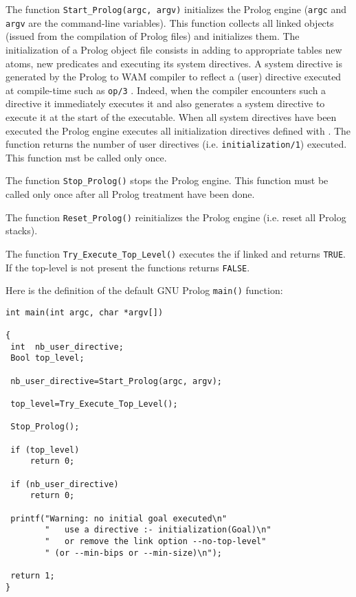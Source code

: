 The function \texttt{Start\_Prolog(argc, argv)} initializes the Prolog engine
(\texttt{argc} and \texttt{argv} are the command-line variables). This
function collects all linked objects (issued from the compilation of Prolog
files) and initializes them. The initialization of a Prolog object file
consists in adding to appropriate tables new atoms, new predicates and
executing its system directives. A system directive is generated by the
Prolog to WAM compiler to reflect a (user) directive executed at compile-time
such as \texttt{op/3} . Indeed, when the compiler encounters
such a directive it immediately executes it and also generates a system
directive to execute it at the start of the executable.  When all system
directives have been executed the Prolog engine executes all initialization
directives defined with 
. The function returns the number of user
directives (i.e. \texttt{initialization/1}) executed. This function mst be
called only once.

The function \texttt{Stop\_Prolog()} stops the Prolog engine. This function
must be called only once after all Prolog treatment have been done.

The function \texttt{Reset\_Prolog()} reinitializes the Prolog engine
(i.e. reset all Prolog stacks).

The function \texttt{Try\_Execute\_Top\_Level()} executes the
 if linked  and returns
\texttt{TRUE}. If the top-level is not present the functions returns
\texttt{FALSE}.

Here is the definition of the default GNU Prolog \texttt{main()} function:

\begin{Indentation}
\begin{verbatim}
int main(int argc, char *argv[])

{
 int  nb_user_directive;
 Bool top_level;

 nb_user_directive=Start_Prolog(argc, argv);

 top_level=Try_Execute_Top_Level();

 Stop_Prolog();

 if (top_level)
     return 0;

 if (nb_user_directive)
     return 0;

 printf("Warning: no initial goal executed\n"
        "   use a directive :- initialization(Goal)\n"
        "   or remove the link option --no-top-level"
        " (or --min-bips or --min-size)\n");

 return 1;
}
\end{verbatim}
\end{Indentation}

